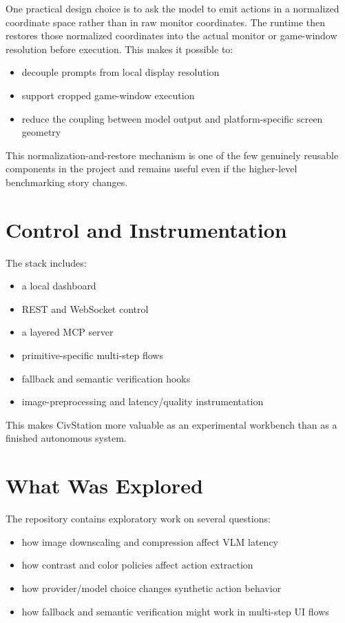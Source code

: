 \documentclass[11pt]{article}
\begin{document}
One practical design choice is to ask the model to emit actions in a normalized coordinate space rather than in raw monitor coordinates. The runtime then restores those normalized coordinates into the actual monitor or game-window resolution before execution. This makes it possible to:
\begin{itemize}[leftmargin=*]
    \item decouple prompts from local display resolution
    \item support cropped game-window execution
    \item reduce the coupling between model output and platform-specific screen geometry
\end{itemize}

This normalization-and-restore mechanism is one of the few genuinely reusable components in the project and remains useful even if the higher-level benchmarking story changes.

\section{Control and Instrumentation}

The stack includes:
\begin{itemize}[leftmargin=*]
    \item a local dashboard
    \item REST and WebSocket control
    \item a layered MCP server
    \item primitive-specific multi-step flows
    \item fallback and semantic verification hooks
    \item image-preprocessing and latency/quality instrumentation
\end{itemize}

This makes CivStation more valuable as an experimental workbench than as a finished autonomous system.

\section{What Was Explored}

The repository contains exploratory work on several questions:
\begin{itemize}[leftmargin=*]
    \item how image downscaling and compression affect VLM latency
    \item how contrast and color policies affect action extraction
    \item how provider/model choice changes synthetic action behavior
    \item how fallback and semantic verification might work in multi-step UI flows
\end{itemize}
\end{document}
